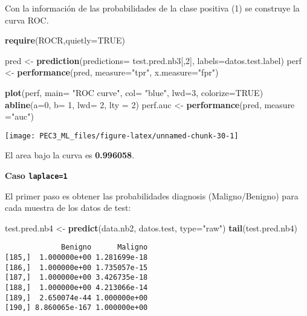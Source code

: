 \documentclass[
]{article}
\newenvironment{Shaded}{\begin{snugshade}}{\end{snugshade}}
\newcommand{\DataTypeTok}[1]{\textcolor[rgb]{0.13,0.29,0.53}{#1}}
\newcommand{\DecValTok}[1]{\textcolor[rgb]{0.00,0.00,0.81}{#1}}
\newcommand{\KeywordTok}[1]{\textcolor[rgb]{0.13,0.29,0.53}{\textbf{#1}}}
\newcommand{\NormalTok}[1]{#1}
\newcommand{\OtherTok}[1]{\textcolor[rgb]{0.56,0.35,0.01}{#1}}
\newcommand{\StringTok}[1]{\textcolor[rgb]{0.31,0.60,0.02}{#1}}
\begin{document}
Con la información de las probabilidades de la clase positiva (1) se
construye la curva ROC.

\begin{Shaded}
\begin{Highlighting}[]
\KeywordTok{require}\NormalTok{(ROCR,}\DataTypeTok{quietly=}\OtherTok{TRUE}\NormalTok{)}

\NormalTok{pred <-}\StringTok{ }\KeywordTok{prediction}\NormalTok{(}\DataTypeTok{predictions=}\NormalTok{ test.pred.nb3[,}\DecValTok{2}\NormalTok{], }\DataTypeTok{labels=}\NormalTok{datos.test.label)}
\NormalTok{perf <-}\StringTok{ }\KeywordTok{performance}\NormalTok{(pred, }\DataTypeTok{measure=}\StringTok{"tpr"}\NormalTok{, }\DataTypeTok{x.measure=}\StringTok{"fpr"}\NormalTok{)}

\KeywordTok{plot}\NormalTok{(perf, }\DataTypeTok{main=} \StringTok{"ROC curve"}\NormalTok{, }\DataTypeTok{col=} \StringTok{"blue"}\NormalTok{, }\DataTypeTok{lwd=}\DecValTok{3}\NormalTok{, }\DataTypeTok{colorize=}\OtherTok{TRUE}\NormalTok{)}
\KeywordTok{abline}\NormalTok{(}\DataTypeTok{a=}\DecValTok{0}\NormalTok{, }\DataTypeTok{b=} \DecValTok{1}\NormalTok{, }\DataTypeTok{lwd=} \DecValTok{2}\NormalTok{, }\DataTypeTok{lty =} \DecValTok{2}\NormalTok{)}
\NormalTok{perf.auc <-}\StringTok{ }\KeywordTok{performance}\NormalTok{(pred, }\DataTypeTok{measure =}\StringTok{"auc"}\NormalTok{)}
\end{Highlighting}
\end{Shaded}

\begin{center}\texttt{[image: PEC3\_ML\_files/figure-latex/unnamed-chunk-30-1]} \end{center}

El area bajo la curva es \textbf{0.996058}.

\textbf{Caso \texttt{laplace=1}}

El primer paso es obtener las probabilidades diagnosis (Maligno/Benigno)
para cada muestra de los datos de test:

\begin{Shaded}
\begin{Highlighting}[]
\NormalTok{test.pred.nb4 <-}\StringTok{ }\KeywordTok{predict}\NormalTok{(data.nb2, datos.test, }\DataTypeTok{type=}\StringTok{"raw"}\NormalTok{)}
\KeywordTok{tail}\NormalTok{(test.pred.nb4)}
\end{Highlighting}
\end{Shaded}

\begin{verbatim}
             Benigno      Maligno
[185,]  1.000000e+00 1.281699e-18
[186,]  1.000000e+00 1.735057e-15
[187,]  1.000000e+00 3.426735e-18
[188,]  1.000000e+00 4.213066e-14
[189,]  2.650074e-44 1.000000e+00
[190,] 8.860065e-167 1.000000e+00
\end{verbatim}
\end{document}

